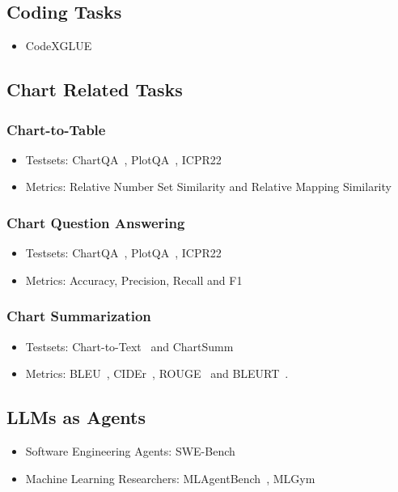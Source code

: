 \documentclass[
	letterpaper, %
]{jdf}
\begin{document}
              \subsection{Coding Tasks}
              \begin{itemize}
    \item CodeXGLUE~\cite{lu2021codexglue}
                            \end{itemize}
                            \subsection{Chart Related Tasks}
\subsubsection{Chart-to-Table}
\begin{itemize}
    \item Testsets: ChartQA~\cite{masry2022chartqa}, PlotQA~\cite{methani2020plotqa}, ICPR22
         \item Metrics: Relative Number Set Similarity and Relative Mapping Similarity~\cite{liu2022deplot}
              \end{itemize}
\subsubsection{Chart Question Answering}
\begin{itemize}
    \item Testsets: ChartQA~\cite{masry2022chartqa}, PlotQA~\cite{methani2020plotqa}, ICPR22
         \item Metrics: Accuracy, Precision, Recall and F1
              \end{itemize}
\subsubsection{Chart Summarization}
\begin{itemize}
    \item Testsets: Chart-to-Text~\cite{kantharaj2022chart} and ChartSumm~\cite{rahman2023chartsumm}
    \item Metrics: BLEU~\cite{post2018call}, CIDEr~\cite{vedantam2015cider}, ROUGE~\cite{lin2004rouge} and BLEURT~\cite{sellam2020bleurt}.
              \end{itemize}
\subsection{LLMs as Agents}
\begin{itemize}
    \item Software Engineering Agents: SWE-Bench~\cite{yang2024swe}
    \item Machine Learning Researchers: MLAgentBench~\cite{huang2023mlagentbench}, MLGym~\cite{nathani2025mlgym}
              \end{itemize}
\end{document}

